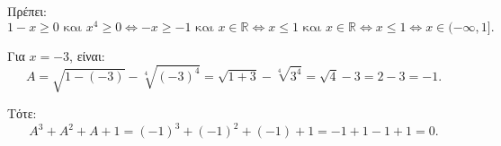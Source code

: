 
\begin{alist}
\item Πρέπει:
\[1 - x \ge 0 \text{ και } x^4 \ge 0 \Leftrightarrow -x \ge -1 \text{ και } x \in \mathbb{R} \Leftrightarrow x \le 1 \text{ και } x \in \mathbb{R} \Leftrightarrow x \le 1 \Leftrightarrow x \in (-\infty, 1].\]

\item Για $x = -3$, είναι:
\[A = \sqrt{1 - (-3)} - \sqrt[4]{(-3)^4} = \sqrt{1 + 3} - \sqrt[4]{3^4} = \sqrt{4} - 3 = 2 - 3 = -1.\]

Τότε:
\[A^3 + A^2 + A + 1 = (-1)^3 + (-1)^2 + (-1) + 1 = -1 + 1 - 1 + 1 = 0.\]
\end{alist}

